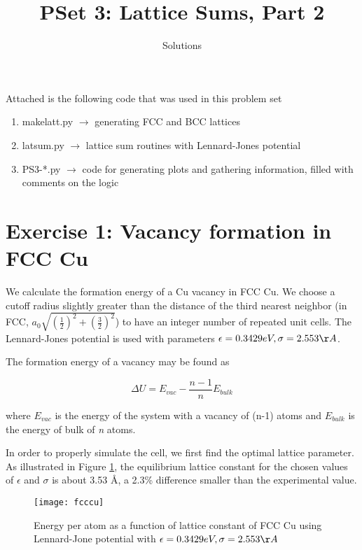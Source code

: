 \documentclass[12pt, oneside]{article}
\title{PSet 3: Lattice Sums, Part 2}
\author{Solutions}
\date{}
\begin{document}
\maketitle

Attached is the following code that was used in this problem set
\vspace{5mm}
 \begin{enumerate}
   \item make\textunderscore latt.py   $\rightarrow$ generating FCC and BCC lattices
   \item lat\textunderscore sum.py   $\rightarrow$ lattice sum routines with Lennard-Jones potential
   \item PS3-*.py     $\rightarrow$ code for generating plots and gathering information, filled with comments on the logic
 \end{enumerate}
 \vspace{5mm}

\section{Exercise 1: Vacancy formation in FCC Cu}

We calculate the formation energy of a Cu vacancy in FCC Cu. We choose a cutoff radius slightly greater than the distance of the third nearest neighbor (in FCC, $a_0 \sqrt{(\frac{1}{2})^2+(\frac{3}{2})^2}$) to have an integer number of repeated unit cells. The Lennard-Jones potential is used with parameters $\epsilon = 0.3429 eV, \sigma = 2.553  \AA$. 

The formation energy of a vacancy may be found as 

\begin{equation}
   \Delta U = E_{vac} - \frac{n-1}{n} E_{bulk}
\end{equation}

\noindent where $E_{vac}$ is the energy of the system with a vacancy of (n-1) atoms and $E_{bulk}$ is the energy of bulk of \textit{n} atoms. 

In order to properly simulate the cell, we first find the optimal lattice parameter. As illustrated in Figure \ref{fig:fcccu}, the equilibrium lattice constant for the chosen values of $\epsilon$ and $\sigma$ is about 3.53  \AA, a 2.3\% difference smaller than the experimental value.

\begin{figure}[htbp]
   \centering
   \texttt{[image: fcccu]} %
   \caption{Energy per atom as a function of lattice constant of FCC Cu using Lennard-Jone potential with $\epsilon = 0.3429 eV, \sigma = 2.553  \AA$ }
   \label{fig:fcccu}
\end{figure} 
\end{document}
